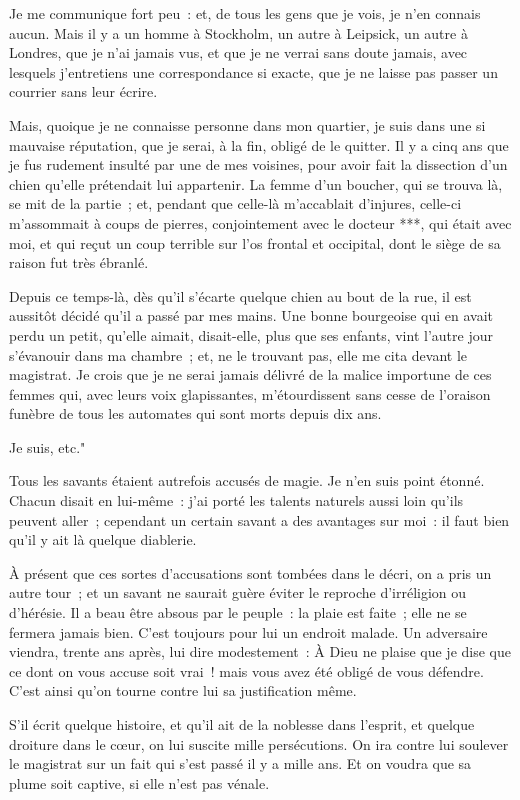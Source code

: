 \documentclass[french,twoside]{book} %
\begin{document}
Je me communique fort peu : et, de tous les gens que je vois, je n’en connais aucun. Mais il y a un homme à Stockholm, un autre à Leipsick, un autre à Londres, que je n’ai jamais vus, et que je ne verrai sans doute jamais, avec lesquels j’entretiens une correspondance si exacte, que je ne laisse pas passer un courrier sans leur écrire.\par
Mais, quoique je ne connaisse personne dans mon quartier, je suis dans une si mauvaise réputation, que je serai, à la fin, obligé de le quitter. Il y a cinq ans que je fus rudement insulté par une de mes voisines, pour avoir fait la dissection d’un chien qu’elle prétendait lui appartenir. La femme d’un boucher, qui se trouva là, se mit de la partie ; et, pendant que celle-là m’accablait d’injures, celle-ci m’assommait à coups de pierres, conjointement avec le docteur ***, qui était avec moi, et qui reçut un coup terrible sur l’os frontal et occipital, dont le siège de sa raison fut très ébranlé.\par
Depuis ce temps-là, dès qu’il s’écarte quelque chien au bout de la rue, il est aussitôt décidé qu’il a passé par mes mains. Une bonne bourgeoise qui en avait perdu un petit, qu’elle aimait, disait-elle, plus que ses enfants, vint l’autre jour s’évanouir dans ma chambre ; et, ne le trouvant pas, elle me cita devant le magistrat. Je crois que je ne serai jamais délivré de la malice importune de ces femmes qui, avec leurs voix glapissantes, m’étourdissent sans cesse de l’oraison funèbre de tous les automates qui sont morts depuis dix ans.\par
Je suis, etc."\par
Tous les savants étaient autrefois accusés de magie. Je n’en suis point étonné. Chacun disait en lui-même : j’ai porté les talents naturels aussi loin qu’ils peuvent aller ; cependant un certain savant a des avantages sur moi : il faut bien qu’il y ait là quelque diablerie.\par
À présent que ces sortes d’accusations sont tombées dans le décri, on a pris un autre tour ; et un savant ne saurait guère éviter le reproche d’irréligion ou d’hérésie. Il a beau être absous par le peuple : la plaie est faite ; elle ne se fermera jamais bien. C’est toujours pour lui un endroit malade. Un adversaire viendra, trente ans après, lui dire modestement : À Dieu ne plaise que je dise que ce dont on vous accuse soit vrai ! mais vous avez été obligé de vous défendre. C’est ainsi qu’on tourne contre lui sa justification même.\par
S’il écrit quelque histoire, et qu’il ait de la noblesse dans l’esprit, et quelque droiture dans le cœur, on lui suscite mille persécutions. On ira contre lui soulever le magistrat sur un fait qui s’est passé il y a mille ans. Et on voudra que sa plume soit captive, si elle n’est pas vénale.\par
\end{document}

